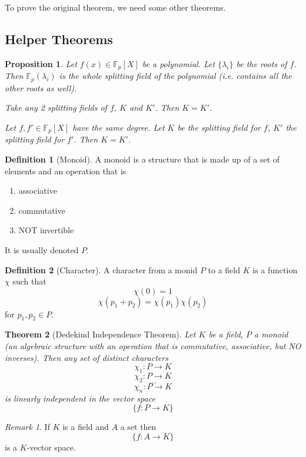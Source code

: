 \documentclass{article}
\theoremstyle{definition}
\newtheorem{defn}{Definition}[section]
\theoremstyle{plain}%
\newtheorem{thm}{Theorem}[section]
\newtheorem{prop}[thm]{Proposition}
\theoremstyle{remark}
\newtheorem*{rem}{Remark}
\newcommand{\F}{\mathbb{F}}
\begin{document}
To prove the original theorem, we need some other theorems.

\subsection{Helper Theorems}

\begin{prop}
    Let $f(x) \in \F_p[X]$ be a polynomial. Let $\{\lambda_i\}$ be the roots of $f$. Then $\F_p(\lambda_i)$ is the whole splitting field of the polynomial (i.e. contains all the other roots as well).
    
    Take any 2 splitting fields of $f$, $K$ and $K'$. Then $K = K'$.
    
    Let $f, f' \in \F_p[X]$ have the same degree. Let $K$ be the splitting field for $f$, $K'$ the splitting field for $f'$. Then $K = K'$.
\end{prop}

\begin{defn}[Monoid]
    A monoid is a structure that is made up of a set of elements and an operation that is
    \begin{enumerate}
        \item associative
        \item commutative
        \item NOT invertible
    \end{enumerate}
    It is usually denoted $P$.
\end{defn}

\begin{defn}[Character]
    A character from a monid $P$ to a field $K$ is a function $\chi$ such that
    \[\chi(0) = 1\]
    \[\chi(p_1 + p_2) = \chi(p_1)\chi(p_2)\]
    for $p_1, p_2 \in P$.
\end{defn}

\begin{thm}[Dedekind Independence Theorem]
    Let $K$ be a field, $P$ a monoid (an algebraic structure with an operation that is commutative, associative, but NO inverses). Then any set of distinct characters
    \[\chi_1 : P \to K\]
    \[\chi_2 : P \to K\]
    \[...\]
    \[\chi_n : P \to K\]
    is linearly independent in the vector space
    \[\{f : P \to K\}\]
\end{thm}

\begin{rem}
    If $K$ is a field and $A$ a set then
    \[\{f : A \to K\}\]
    is a $K$-vector space.
\end{rem}
\end{document}
